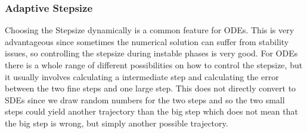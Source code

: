 	\subsubsection{Adaptive Stepsize}
	Choosing the Stepsize dynamically is a common feature for ODEs. This is very advantageous since sometimes the numerical solution can suffer from stability issues, so controlling the stepsize during instable phases is very good. For ODEs there is a whole range of different possibilities on how to control the stepsize, but it usually involves calculating a intermediate step and calculating the error between the two fine steps and one large step. This does not directly convert to SDEs since we draw random numbers for the two steps and so the two small steps could yield another trajectory than the big step which does not mean that the big step is wrong, but simply another possible trajectory.
	
